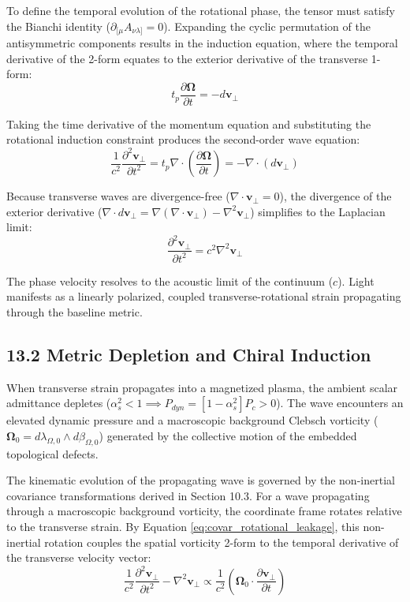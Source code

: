 To define the temporal evolution of the rotational phase, the tensor must satisfy the Bianchi identity ($\partial_{[\mu} A_{\nu\lambda]} = 0$). Expanding the cyclic permutation of the antisymmetric components results in the induction equation, where the temporal derivative of the 2-form equates to the exterior derivative of the transverse 1-form:
\begin{equation}
    t_p \frac{\partial \boldsymbol{\Omega}}{\partial t} = - d\mathbf{v}_\perp
\end{equation}

Taking the time derivative of the momentum equation and substituting the rotational induction constraint produces the second-order wave equation: 
\begin{equation}
    \frac{1}{c^2} \frac{\partial^2 \mathbf{v}_\perp}{\partial t^2} = t_p \nabla \cdot \left( \frac{\partial \boldsymbol{\Omega}}{\partial t} \right) = - \nabla \cdot (d\mathbf{v}_\perp)
\end{equation}

Because transverse waves are divergence-free ($\nabla \cdot \mathbf{v}_\perp = 0$), the divergence of the exterior derivative ($\nabla \cdot d\mathbf{v}_\perp = \nabla(\nabla \cdot \mathbf{v}_\perp) - \nabla^2 \mathbf{v}_\perp$) simplifies to the Laplacian limit: 
\begin{equation}
    \frac{\partial^2 \mathbf{v}_\perp}{\partial t^2} = c^2 \nabla^2 \mathbf{v}_\perp
\end{equation}

The phase velocity resolves to the acoustic limit of the continuum ($c$). Light manifests as a linearly polarized, coupled transverse-rotational strain propagating through the baseline metric.


\subsection*{13.2 Metric Depletion and Chiral Induction}
When transverse strain propagates into a magnetized plasma, the ambient scalar admittance depletes ($\alpha_s^2 < 1 \implies P_{dyn} = [1 - \alpha_s^2]P_c > 0$). The wave encounters an elevated dynamic pressure and a macroscopic background Clebsch vorticity ($\boldsymbol{\Omega}_0 = d\lambda_{\Omega,0} \wedge d\beta_{\Omega,0}$) generated by the collective motion of the embedded topological defects.

The kinematic evolution of the propagating wave is governed by the non-inertial covariance transformations derived in Section 10.3. For a wave propagating through a macroscopic background vorticity, the coordinate frame rotates relative to the transverse strain. By Equation \ref{eq:covar_rotational_leakage}, this non-inertial rotation couples the spatial vorticity 2-form to the temporal derivative of the transverse velocity vector: 
\begin{equation}
    \frac{1}{c^2}\frac{\partial^2 \mathbf{v}_\perp}{\partial t^2} - \nabla^2 \mathbf{v}_\perp \propto \frac{1}{c^2} \left( \boldsymbol{\Omega}_0 \cdot \frac{\partial \mathbf{v}_\perp}{\partial t} \right) 
\end{equation}

